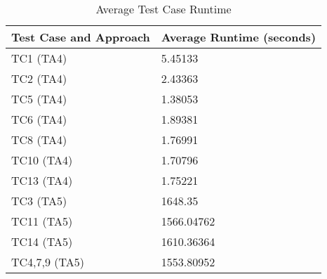 \begin{table}[h!]
\begin{tabular}{|l | l|}
\hline
\textbf{Test Case and Approach} & \textbf{Average Runtime (seconds)} \\
\hline
TC1 (TA4) & 5.45133 \\
\hline
TC2 (TA4) & 2.43363 \\
\hline
TC5 (TA4) & 1.38053 \\
\hline
TC6 (TA4) & 1.89381 \\
\hline
TC8 (TA4) & 1.76991 \\
\hline
TC10 (TA4) & 1.70796 \\
\hline
TC13 (TA4) & 1.75221 \\
\hline
TC3 (TA5) & 1648.35 \\
\hline
TC11 (TA5) & 1566.04762 \\
\hline
TC14 (TA5) & 1610.36364 \\
\hline
TC4,7,9 (TA5) & 1553.80952 \\
\hline
\end{tabular}
\caption{Average Test Case Runtime}
\label{tab:avg_runtime_tc}
\end{table}
